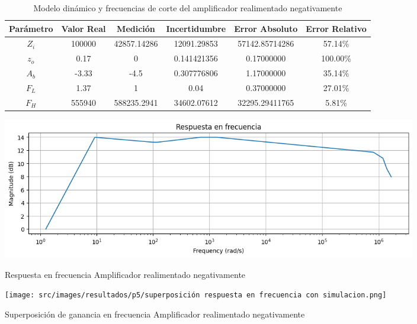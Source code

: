 \begin{table}[h!]
\centering
\begin{tabular}{|c|c|c|c|c|c|}
\hline
\textbf{Parámetro} & \textbf{Valor Real} & \textbf{Medición} & \textbf{Incertidumbre} & \textbf{Error Absoluto} & \textbf{Error Relativo} \\ \hline
$Z_i$ & 100000 & 42857.14286 & 12091.29853 & 57142.85714286 & 57.14\% \\ \hline
$z_o$ & 0.17 & 0 & 0.141421356 & 0.17000000 & 100.00\% \\ \hline
$A_b$ & -3.33 & -4.5 & 0.307776806 & 1.17000000 & 35.14\% \\ \hline
$F_L$ & 1.37 & 1 & 0.04 & 0.37000000 & 27.01\% \\ \hline
$F_H$ & 555940 & 588235.2941 & 34602.07612 & 32295.29411765 & 5.81\% \\ \hline
\end{tabular}
\caption{Modelo dinámico y frecuencias de corte del amplificador realimentado negativamente}
\label{tab:med-modelo-dinamico-frecuencias-corte-amplificador-realimentado-negativamente}
\end{table}

\begin{ilustracion}[ht]
    \centering
    \includegraphics[width=0.8\textwidth]{src/images/resultados/p5/respuesta en frecuencia realimentacion negativa.png}
    \caption{Respuesta en frecuencia Amplificador realimentado negativamente}
    \label{ilus:amplificador-realimentado-negativamente}
\end{ilustracion}

\begin{ilustracion}
    \centering
    \texttt{[image: src/images/resultados/p5/superposición respuesta en frecuencia con simulacion.png]}
    \caption{Superposición de ganancia en frecuencia Amplificador realimentado negativamente}
    \label{ilus:amplificador-realimentado-negativamente-superposicion}
\end{ilustracion}